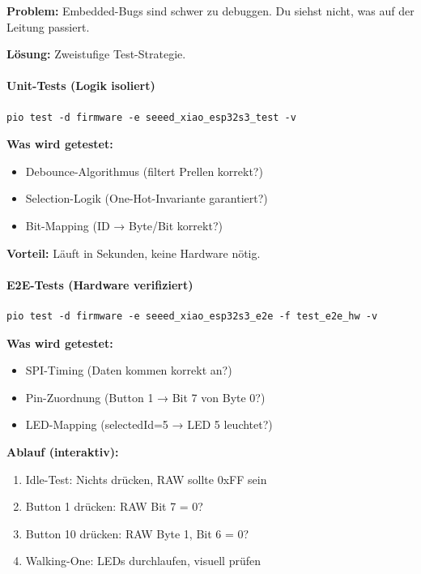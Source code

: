 \textbf{Problem:} Embedded-Bugs sind schwer zu debuggen. Du siehst nicht, was auf der Leitung passiert.

\textbf{Lösung:} Zweistufige Test-Strategie.

\paragraph{Unit-Tests (Logik isoliert)}

\begin{lstlisting}[style=shell]
pio test -d firmware -e seeed_xiao_esp32s3_test -v
\end{lstlisting}

\textbf{Was wird getestet:}
\begin{itemize}
\item Debounce-Algorithmus (filtert Prellen korrekt?)
\item Selection-Logik (One-Hot-Invariante garantiert?)
\item Bit-Mapping (ID → Byte/Bit korrekt?)
\end{itemize}

\textbf{Vorteil:} Läuft in Sekunden, keine Hardware nötig.

\paragraph{E2E-Tests (Hardware verifiziert)}

\begin{lstlisting}[style=shell]
pio test -d firmware -e seeed_xiao_esp32s3_e2e -f test_e2e_hw -v
\end{lstlisting}

\textbf{Was wird getestet:}
\begin{itemize}
\item SPI-Timing (Daten kommen korrekt an?)
\item Pin-Zuordnung (Button 1 → Bit 7 von Byte 0?)
\item LED-Mapping (selectedId=5 → LED 5 leuchtet?)
\end{itemize}

\textbf{Ablauf (interaktiv):}
\begin{enumerate}
\item Idle-Test: Nichts drücken, RAW sollte 0xFF sein
\item Button 1 drücken: RAW Bit 7 = 0?
\item Button 10 drücken: RAW Byte 1, Bit 6 = 0?
\item Walking-One: LEDs durchlaufen, visuell prüfen
\end{enumerate}

